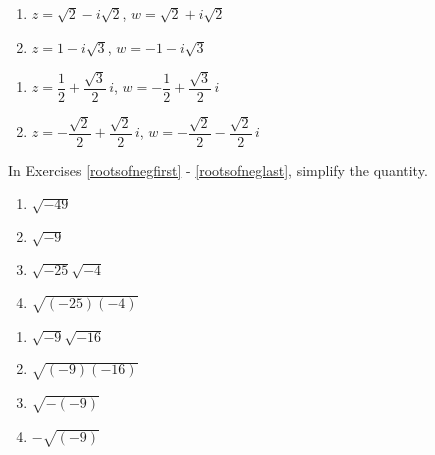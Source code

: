 \documentclass[11pt]{article}
\theoremstyle{definition}  %
\newcounter{HW}
\begin{document}
\begin{multicols}{2}
\begin{enumerate}
\setcounter{enumi}{\value{HW}}

\item  $z = \sqrt{2} - i\sqrt{2}$, $w = \sqrt{2} + i\sqrt{2}$
\item  $z = 1 - i\sqrt{3}$, $w = -1 - i\sqrt{3}$

\setcounter{HW}{\value{enumi}}
\end{enumerate}
\end{multicols}

\begin{multicols}{2}
\begin{enumerate}
\setcounter{enumi}{\value{HW}}

\item  $z = \dfrac{1}{2} + \dfrac{\sqrt{3}}{2} \, i$, $w = -\dfrac{1}{2} + \dfrac{\sqrt{3}}{2} \,i$
\item  $z = -\dfrac{\sqrt{2}}{2} + \dfrac{\sqrt{2}}{2} \, i$, $w = -\dfrac{\sqrt{2}}{2} - \dfrac{\sqrt{2}}{2} \, i$ \label{compnumbasiclast}

\setcounter{HW}{\value{enumi}}
\end{enumerate}
\end{multicols}

In Exercises \ref{rootsofnegfirst} - \ref{rootsofneglast}, simplify the quantity.

\begin{multicols}{4}
\begin{enumerate}
\setcounter{enumi}{\value{HW}}

\item $\sqrt{-49}$ \label{rootsofnegfirst}
\item $\sqrt{-9}$
\item $\sqrt{-25}\sqrt{-4}$
\item $\sqrt{(-25)(-4)}$

\setcounter{HW}{\value{enumi}}
\end{enumerate}
\end{multicols}

\begin{multicols}{4}
\begin{enumerate}
\setcounter{enumi}{\value{HW}}

\item $\sqrt{-9}\sqrt{-16}$
\item $\sqrt{(-9)(-16)}$
\item $\sqrt{-(-9)}$
\item $-\sqrt{(-9)}$ \label{rootsofneglast}

\setcounter{HW}{\value{enumi}}
\end{enumerate}
\end{multicols}
\end{document}
